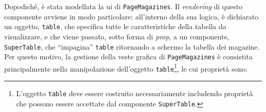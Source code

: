 
Dopodiché, è stata modellata la \acrshort{ui} di \texttt{PageMagazines}. Il \textit{rendering} di questo componente avviene in modo particolare: all'interno della sua logica, è dichiarato un oggetto, \texttt{table}, che specifica tutte le caratteristiche della tabella da visualizzare, e che viene passato, sotto forma di \textit{prop}, a un componente, \texttt{SuperTable}, che “impagina” \texttt{table} ritornando a schermo la tabella dei magazine.\\
Per questo motivo, la gestione della veste grafica di \texttt{PageMagazines} è consistita principalmente nella manipolazione dell'oggetto \texttt{table}\footnote{L'oggetto \texttt{table} deve essere costruito necessariamente includendo proprietà che possono essere accettate dal componente \texttt{SuperTable}.}, le cui proprietà sono:
